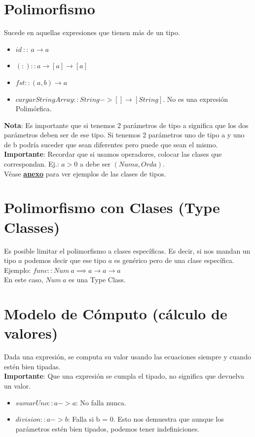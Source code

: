 \documentclass[10pt,a4paper]{article}
\begin{document}
\section*{Polimorfismo}
Sucede en aquellas expresiones que tienen más de un tipo. 
\begin{itemize}
    \item $ id \ :: \ a \rightarrow a $
    \item $(:) :: a \rightarrow [a] \rightarrow [a]$
    \item $fst :: (a, b) \rightarrow a$
    \item $cargarStringArray :: String -> [] \rightarrow [String]$. No es una expresión Polimórfica.
\end{itemize}
\textbf{Nota}: Es importante que si tenemos 2 parámetros de tipo a significa que los dos parámetros deben ser de ese tipo. Si tenemos 2 parámetros uno de tipo a y uno de b podría suceder que sean diferentes pero puede que sean el mismo. 
\textbf{Importante}: Recordar que si usamos operadores, colocar las clases que correspondan. Ej.: $a>0$ a debe ser $(Num a, Ord a)$. \\
Véase \hyperref[subsec:clases_tipos]{\underline{\textbf{anexo}}} para ver ejemplos de las clases de tipos.
\section*{Polimorfismo con Clases (Type Classes)}
Es posible limitar el polimorfismo a clases específicas. Es decir, si nos mandan un tipo $a$ podemos decir que ese tipo $a$ es genérico pero de una clase específica. \\
Ejemplo: $func :: Num \ a \implies a \rightarrow a \rightarrow a$ \\
En este caso, $Num \ a $ es una Type Class.
\section*{Modelo de Cómputo (cálculo de valores)}
Dada una expresión, se computa su valor usando las ecuaciones siempre y cuando estén bien tipadas. \\
\textbf{Importante}: Que una expresión se cumpla el tipado, no significa que devuelva un valor.
\begin{itemize}
    \item $sumarUno :: a -> a$: No falla nunca.
    \item $division :: a -> b$: Falla si b = 0. Esto nos demuestra que aunque los parámetros estén bien tipados, podemos tener indefiniciones.
\end{itemize}
\end{document}
